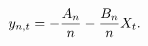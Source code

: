 \begin{equation} \label{eq:yAffine}
	y_{n,t} = - \frac{A_{n}}{n} - \frac{B_{n}}{n} X_{t} .
\end{equation}